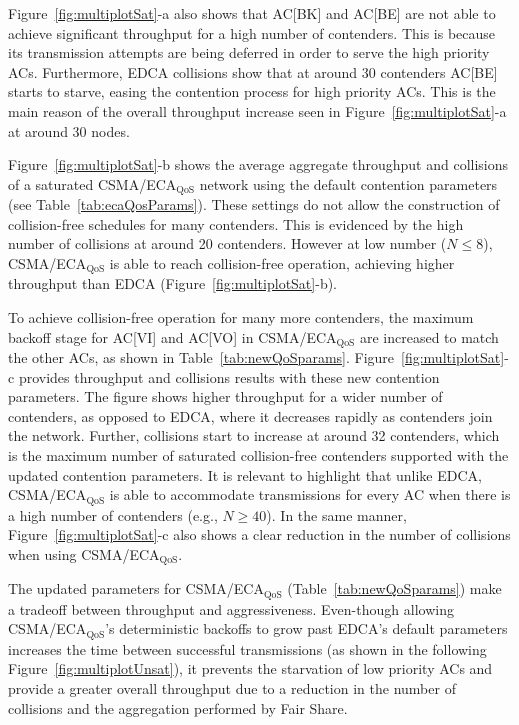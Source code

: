 Figure~\ref{fig:multiplotSat}-a also shows that AC[BK] and AC[BE] are not able to achieve significant throughput for a high number of contenders. This is because its transmission attempts are being deferred in order to serve the high priority ACs. Furthermore, EDCA collisions show that at around 30 contenders AC[BE] starts to starve, easing the contention process for high priority ACs. This is the main reason of the overall throughput increase seen in Figure~\ref{fig:multiplotSat}-a at around 30 nodes.

Figure~\ref{fig:multiplotSat}-b shows the average aggregate throughput and collisions of a saturated CSMA/ECA$_{\text{QoS}}$ network using the default contention parameters (see Table~\ref{tab:ecaQosParams}). These settings do not allow the construction of collision-free schedules for many contenders. This is evidenced by the high number of collisions at around 20 contenders. However at low number ($N\leq 8$), CSMA/ECA$_{\text{QoS}}$ is able to reach collision-free operation, achieving higher throughput than EDCA (Figure~\ref{fig:multiplotSat}-b).

To achieve collision-free operation for many more contenders, the maximum backoff stage for AC[VI] and AC[VO] in CSMA/ECA$_{\text{QoS}}$ are increased to match the other ACs, as shown in Table~\ref{tab:newQoSparams}. Figure~\ref{fig:multiplotSat}-c provides throughput and collisions results with these new contention parameters. The figure shows higher throughput for a wider number of contenders, as opposed to EDCA, where it decreases rapidly as contenders join the network. Further, collisions start to increase at around 32 contenders, which is the maximum number of saturated collision-free contenders supported with the updated contention parameters. It is relevant to highlight that unlike EDCA, CSMA/ECA$_{\text{QoS}}$ is able to accommodate transmissions for every AC when there is a high number of contenders (e.g., $N\geq 40$). In the same manner, Figure~\ref{fig:multiplotSat}-c also shows a clear reduction in the number of collisions when using CSMA/ECA$_{\text{QoS}}$.

The updated parameters for CSMA/ECA$_{\text{QoS}}$ (Table~\ref{tab:newQoSparams}) make a tradeoff between throughput and aggressiveness. Even-though allowing CSMA/ECA$_{\text{QoS}}$'s deterministic backoffs to grow past EDCA's default parameters increases the time between successful transmissions (as shown in the following Figure~\ref{fig:multiplotUnsat}), it prevents the starvation of low priority ACs and provide a greater overall throughput due to a reduction in the number of collisions and the aggregation performed by Fair Share.


